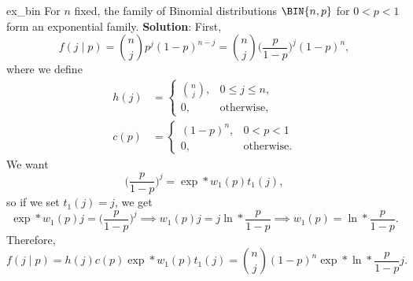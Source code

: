 \begin{Example}{}{ex_bin}
    For $ n $ fixed, the family of Binomial distributions $ \BIN{n,p} $ for $ 0<p<1 $ form an exponential family.
    \tcblower{}
    \textbf{Solution}: First,
    \[ f(j\mid p)=\binom{n}{j}p^j(1-p)^{n-j}=\binom{n}{j}\biggl(\frac{p}{1-p}\biggr)^{\!j}(1-p)^n, \]
    where we define
    \begin{align*}
        h(j) & =\begin{cases}
                    \binom{n}{j}, & 0\le j\le n,      \\
                    0,            & \text{otherwise},
                \end{cases} \\
        c(p) & =\begin{cases}
                    (1-p)^n, & 0<p<1             \\
                    0,       & \text{otherwise}.
                \end{cases}
    \end{align*}
    We want
    \[ \biggl(\frac{p}{1-p}\biggr)^{\!j}=\exp*{w_1(p)t_1(j)}, \]
    so if we set $ t_1(j)=j $, we get
    \[ \exp*{w_1(p)j}=\biggl(\frac{p}{1-p}\biggr)^{\!j}\implies w_1(p)j=j\ln*{\frac{p}{1-p}}\implies w_1(p)=\ln*{\frac{p}{1-p}}. \]
    Therefore,
    \[ f(j\mid p)=h(j)c(p)\exp*{w_1(p)t_1(j)}=\binom{n}{j}(1-p)^n\exp*{\ln*{\frac{p}{1-p}}j}. \]
\end{Example}
